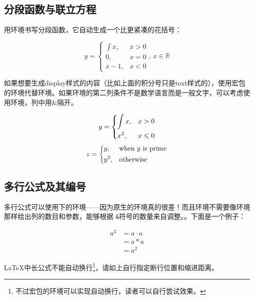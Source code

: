 \subsection{分段函数与联立方程}
用环境书写分段函数，它自动生成一个比更紧凑的花括号：

\begin{codeshow}
\[y=\begin{cases}
\int x, & x>0 \\
0,   & x=0 \\
x-1, & x<0
\end{cases},\,x\in\mathbb{R}\]
\end{codeshow}

如果想要生成display样式的内容（比如上面的积分号只是text样式的），使用宏包的环境代替环境。如果环境的第二列条件不是数学语言而是一般文字，可以考虑使用环境，列中用\&{}隔开。

\begin{codeshow}
\[y=\begin{dcases}
  \int x, & x>0 \\
  x^2, & x\leqslant 0
  \end{dcases}\]
\[z=\begin{dcases*}
  y, & when $y$ is prime\\
  y^2, & otherwise
  \end{dcases*}\]
\end{codeshow}

\subsection{多行公式及其编号}
\label{subsec:multieqnum}
多行公式可以使用下的环境——因为原生的环境真的很差！而且环境不需要像环境那样给出列的数目和参数，能够根据
\texttt{\&}符号的数量来自调整。。下面是一个例子：

\begin{codeshow}
\begin{align}
  a^2  &= a\cdot a \\
       &= a*a      \\
       &= a^2
\end{align}
\end{codeshow}

\LaTeX 中长公式不能自动换行\footnote{不过宏包的环境可以实现自动换行，读者可以自行尝试效果。}，请如上自行指定断行位置和缩进距离。

